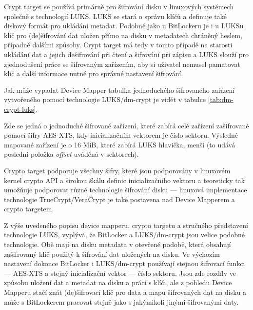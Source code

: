 
Crypt target se používá primárně pro šifrování disku v linuxových systémech společně s technologií LUKS. LUKS se stará o správu klíčů a definuje také diskový formát pro ukládání metadat. Podobně jako u BitLockeru je i u LUKSu klíč pro (de)šifrování dat uložen přímo na disku v metadatech chráněný heslem, případně dalšími způsoby. Crypt target má tedy v tomto případě na starosti ukládání dat a jejich dešifrování při čtení a šifrování při zápisu a LUKS slouží pro zjednodušení práce se šifrovaným zařízením, aby si uživatel nemusel pamatovat klíč a další informace nutné pro správné nastavení šifrování.\cite{Fruhwirth2005}

Jak může vypadat Device Mapper tabulka jednoduchého šifrovaného zařízení vy\-tvo\-ře\-né\-ho pomocí technologie LUKS/dm-crypt je vidět v tabulce \ref{tab:dm-crypt-luks}.


Zde se jedná o jednoduché šifrované zařízení, které zabírá celé zařízení zašifrované pomocí šifry AES-XTS, kdy inicializačním vektorem je číslo sektoru. Výsledné mapované zařízení je o 16 MiB, které zabírá LUKS hlavička, menší (to udává poslední položka \emph{offset} uváděná v sektorech).

Crypto target podporuje všechny šifry, které jsou podporovány v linuxovém kernel crypto API a širokou škálu definic inicializačního vektoru a teoreticky tak umožňuje podporovat různé technologie šifrování disku --- linuxová implementace technologie TrueCrypt/VeraCrypt je také postavena nad Device Mapperem a crypto targetem\cite{Broz2014}.


Z výše uvedeného popisu device mapperu, crypto targetu a stručného představení technologie LUKS, vyplývá, že BitLocker a LUKS/dm-crypt jsou velice podobné technologie. Obě mají na disku metadata v otevřené podobě, která obsahují zašifrovaný klíč použitý k šifrování dat uložených na disku. Ve výchozím nastavení dokonce BitLocker i LUKS/dm-crypt používají stejnou šifrovací funkci --- AES-XTS a stejný inicializační vektor --- číslo sektoru. Jsou zde rozdíly ve způsobu uložení dat a metadat na disku a práci s klíči, ale z pohledu Device Mapperu stačí znát (de)šifrovací klíč pro data a mapu šifrovaných dat na disku a může s BitLockerem pracovat stejně jako s jakýmikoli jinými šifrovanými daty.

